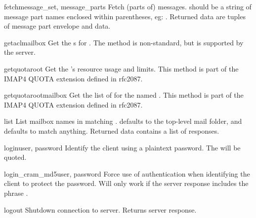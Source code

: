 \begin{methoddesc}{fetch}{message_set, message_parts}
  Fetch (parts of) messages.   should be
  a string of message part names enclosed within parentheses,
  eg: .  Returned data are tuples
  of message part envelope and data.
\end{methoddesc}

\begin{methoddesc}{getacl}{mailbox}
  Get the s for .
  The method is non-standard, but is supported by the  server.
\end{methoddesc}

\begin{methoddesc}{getquota}{root}
  Get the  's resource usage and limits.
  This method is part of the IMAP4 QUOTA extension defined in rfc2087.
\end{methoddesc}

\begin{methoddesc}{getquotaroot}{mailbox}
  Get the list of   for the named .
  This method is part of the IMAP4 QUOTA extension defined in rfc2087.
\end{methoddesc}

\begin{methoddesc}{list}{}
  List mailbox names in  matching
  .   defaults to the top-level mail
  folder, and  defaults to match anything.  Returned data
  contains a list of  responses.
\end{methoddesc}

\begin{methoddesc}{login}{user, password}
  Identify the client using a plaintext password.
  The  will be quoted.
\end{methoddesc}

\begin{methoddesc}{login_cram_md5}{user, password}
  Force use of  authentication when identifying the client to protect the password.
  Will only work if the server  response includes the phrase .
\end{methoddesc}

\begin{methoddesc}{logout}{}
  Shutdown connection to server. Returns server  response.
\end{methoddesc}


